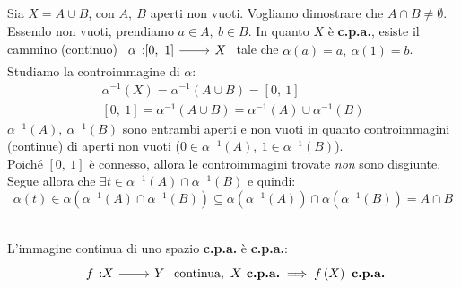 \begin{demonstration}
	Sia $X=A\cup B$, con $A,\ B$ aperti non vuoti. Vogliamo dimostrare che $A\cap B\neq \emptyset$. Essendo non vuoti, prendiamo $a\in A,\ b\in B$. In quanto $X$ è \textbf{c.p.a.}, esiste il cammino (continuo) $\funz{\alpha}{\left[0,\ 1\right]}{X}$ tale che $\alpha\left(a\right)=a,\ \alpha\left(1\right)=b$.\\
	Studiamo la controimmagine di $\alpha$:
	\begin{gather*}
		\alpha^{-1}\left(X\right)=\alpha^{-1}\left(A\cup B\right)=\left[0,\ 1\right]\\
		\left[0,\ 1\right]=\alpha^{-1}\left(A\cup B\right)=\alpha^{-1}\left(A\right)\cup \alpha^{-1}\left(B\right)
	\end{gather*}
$\alpha^{-1}\left(A\right),\ \alpha^{-1}\left(B\right)$ sono entrambi aperti e non vuoti in quanto controimmagini (continue) di aperti non vuoti ($0\in \alpha^{-1}\left(A\right),\ 1\in \alpha^{-1}\left(B\right)$).\\
Poiché $\left[0,\ 1\right]$ è connesso, allora le controimmagini trovate \textit{non} sono disgiunte. Segue allora che $\exists t\in \alpha^{-1}\left(A\right)\cap \alpha^{-1}\left(B\right)$ e quindi:
\begin{equation*}
\alpha\left(t\right)\in\alpha\left(\alpha^{-1}\left(A\right)\cap \alpha^{-1}\left(B\right)\right)\subseteq\alpha\left(\alpha^{-1}\left(A\right)\right)\cap\alpha\left(\alpha^{-1}\left(B\right)\right)=A\cap B
\end{equation*}
\end{demonstration}
\vspace{-3mm}
\begin{theorema}~{}\\
	L'immagine continua di uno spazio \textbf{c.p.a.} è \textbf{c.p.a.}:
	\begin{equation}
		\funz{f}{X}{Y}\text{ continua},\ X\textbf{ c.p.a.}\implies f\left(X\right)\textbf{ c.p.a.}
	\end{equation}
	\vspace{-6mm}
\end{theorema}
